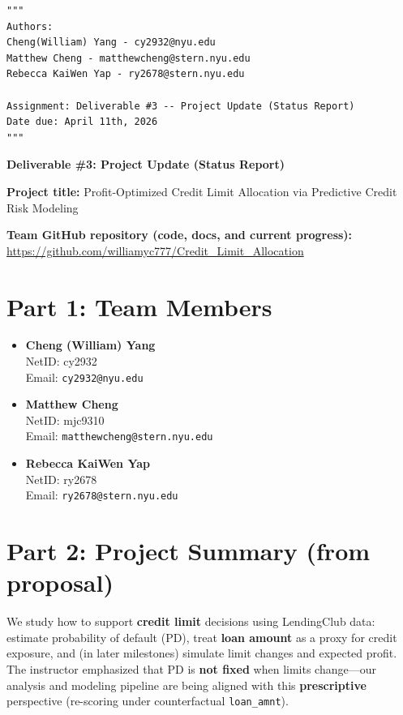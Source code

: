 \documentclass[12pt,letterpaper]{report}
\begin{document}
\begin{verbatim}
"""
Authors: 
Cheng(William) Yang - cy2932@nyu.edu
Matthew Cheng - matthewcheng@stern.nyu.edu 
Rebecca KaiWen Yap - ry2678@stern.nyu.edu 

Assignment: Deliverable #3 -- Project Update (Status Report)
Date due: April 11th, 2026
"""
\end{verbatim}

\begin{center}
    \textbf{\large{Deliverable \#3: Project Update (Status Report)}}
\end{center}

\noindent\textbf{Project title:} Profit-Optimized Credit Limit Allocation via Predictive Credit Risk Modeling

\vspace{0.5em}
\noindent\textbf{Team GitHub repository (code, docs, and current progress):} \\
\url{https://github.com/williamyc777/Credit_Limit_Allocation}

\section*{Part 1: Team Members}

\begin{itemize}
    \item \textbf{Cheng (William) Yang} \\
    NetID: cy2932 \\
    Email: \texttt{cy2932@nyu.edu}
    
    \item \textbf{Matthew Cheng} \\
    NetID: mjc9310 \\
    Email: \texttt{matthewcheng@stern.nyu.edu}
    
    \item \textbf{Rebecca KaiWen Yap} \\
    NetID: ry2678 \\
    Email: \texttt{ry2678@stern.nyu.edu}
\end{itemize}

\section*{Part 2: Project Summary (from proposal)}

We study how to support \textbf{credit limit} decisions using LendingClub data: estimate probability of default (PD), treat \textbf{loan amount} as a proxy for credit exposure, and (in later milestones) simulate limit changes and expected profit. The instructor emphasized that PD is \textbf{not fixed} when limits change---our analysis and modeling pipeline are being aligned with this \textbf{prescriptive} perspective (re-scoring under counterfactual \texttt{loan\_amnt}).
\end{document}
